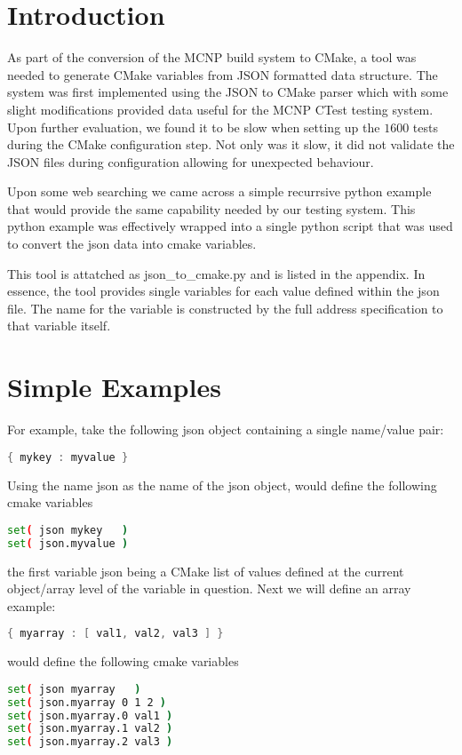 \documentclass[12pt]{article}
\begin{document}
\section{Introduction}

As part of the conversion of the MCNP build system to CMake, a tool was needed to generate CMake variables
from JSON formatted data structure.  The system was first implemented using the JSON to CMake parser \cite{jsoncmake} which with some slight modifications provided data useful for the MCNP CTest testing system.  Upon further evaluation, we found it to be slow when setting up the $1600$ tests during the CMake configuration step.  Not only was it slow, it did not validate the JSON files during configuration allowing for unexpected behaviour.   

Upon some web searching we came across a simple recurrsive python example that would provide the same capability needed by our testing system\cite{flatten}.  This python example was effectively wrapped into a single python script that was used to convert the json data into cmake variables.

This tool is attatched as json\_to\_cmake.py and is listed in the appendix.  In essence, the tool provides single variables for each value defined within the json file. The name for the variable is constructed by the full address specification to that variable itself.

\section{Simple Examples}
For example, take the following json object containing a single name/value pair:
\begin{lstlisting}[language=java,basicstyle=\tiny,frame=single]
{ mykey : myvalue }
\end{lstlisting}

Using the name json as the name of the json object, would define the following cmake variables
\begin{lstlisting}[language=bash,basicstyle=\tiny,frame=single]
set( json mykey   ) 
set( json.myvalue )
\end{lstlisting}
the first variable json being a CMake list of values defined at the current object/array level of the variable in question.
Next we will define an array example:
\begin{lstlisting}[language=java,basicstyle=\tiny,frame=single]
{ myarray : [ val1, val2, val3 ] }
\end{lstlisting}
would define the following cmake variables
\begin{lstlisting}[language=bash,basicstyle=\tiny,frame=single]
set( json myarray   ) 
set( json.myarray 0 1 2 )
set( json.myarray.0 val1 ) 
set( json.myarray.1 val2 ) 
set( json.myarray.2 val3 ) 
\end{lstlisting}
\end{document}
